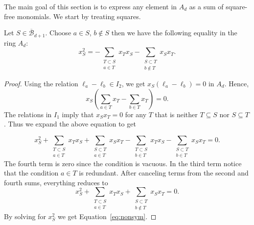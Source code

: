 \documentclass[ALCO,ThmDefs,Unicode,epreuves]{cedram}
\renewcommand\l{\ell}
\newcommand{\hB}{\overline{\mathcal B}}
\begin{document}
The main goal of this section is to express any element in $A_d$ as a sum of square-free monomials. We start by treating squares.


\begin{lemm}\label{lem:nonsym}
	Let $S\in\hB_{d+1}$. Choose $a\in S$, $b\notin S$ then we have the following equality in the ring $A_d$:
	\begin{equation}\label{eq:nonsym}
	x_S^2 = -\sum_{\substack{T\subset S \\ a\in T}}x_Tx_S -\sum_{\substack{S\subset T \\ b\notin T}} x_Sx_T.
	\end{equation}
\end{lemm}
\begin{proof}
	Using the relation $\l_a-\l_b\in I_2$, we get $x_S(\l_a-\l_b)=0$ in $A_d$. Hence, %
	\begin{equation}
	x_S\left(\sum_{a\in T}x_T-\sum_{b\in T}x_T\right) = 0.
	\end{equation}
	The relations in $I_1$ imply that $x_S x_T=0$ for any $T$ that is neither $T\subseteq S$ nor $S\subseteq T$. Thus we expand the above equation to get
	
	\begin{equation}
	x_S^2+\sum_{ \substack{T\subset S\\ a\in T}} x_Tx_S + \sum_{\substack{S\subset T\\ a\in T}} x_Sx_T - \sum_{ \substack{T\subset S\\ b\in T}} x_Tx_S - \sum_{\substack{S\subset T\\ b\in T}} x_Sx_T = 0.
	\end{equation}
	The fourth term is zero since the condition is vacuous. In the third term notice that the condition $a\in T$ is redundant. After canceling terms from the second and fourth sums, everything reduces to
	\[
	x_S^2+\sum_{\substack{T\subset S \\ a\in T}}x_Tx_S + \sum_{\substack{S\subset T \\ b\notin T}}x_Sx_T = 0.
	\]
	By solving for $x_S^2$ we get Equation~\eqref{eq:nonsym}.
\end{proof}
\end{document}
